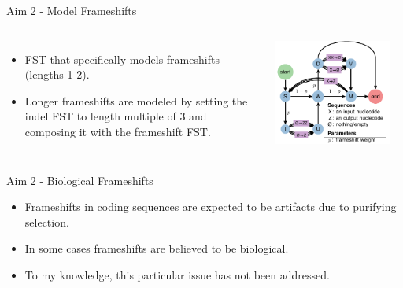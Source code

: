 \documentclass[aspectratio=169]{beamer}
\begin{document}
\begin{frame}{Aim 2 - Model Frameshifts} %
\begin{columns}
\begin{itemize}
	\setlength\itemsep{1em}
	\item FST that specifically models frameshifts (lengths 1-2).
	\item Longer frameshifts are modeled by setting the indel FST to length
		multiple of 3 and composing it with the frameshift FST.
\end{itemize}
\includegraphics[width=0.9\textwidth]{fig-fst-frameshifts.pdf}
\end{columns}
\end{frame} %

\begin{frame}{Aim 2 - Biological Frameshifts} %
\begin{itemize}
	\setlength\itemsep{1em}
	\item Frameshifts in coding sequences are expected to be artifacts due to
		purifying selection.
	\item In some cases frameshifts are believed to be biological.
	\item To my knowledge, this particular issue has not been addressed.
\end{itemize}

\end{frame} %
\end{document}
